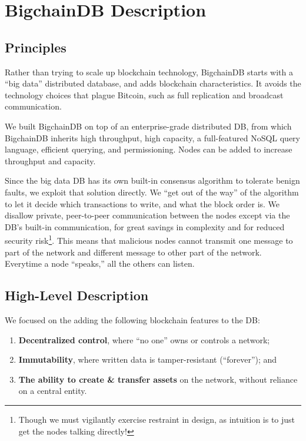 \section{BigchainDB Description}\label{sec:bigchaindb}

\subsection{Principles}
Rather than trying to scale up blockchain technology, BigchainDB starts with a “big data” distributed database, and adds blockchain characteristics.
It avoids the technology choices that plague Bitcoin, such as full replication and broadcast communication.

We built BigchainDB on top of an enterprise-grade distributed DB, from which BigchainDB inherits high throughput, high capacity, a full-featured NoSQL query language, efficient querying, and permissioning. Nodes can be added to increase throughput and capacity.

Since the big data DB has its own built-in consensus algorithm to tolerate benign faults, we exploit that solution directly.
We “get out of the way” of the algorithm to let it decide which transactions to write, and what the block order is.
We disallow private, peer-to-peer communication between the nodes except via the DB’s built-in communication, for great savings in complexity and for reduced security risk\footnote{Though we must vigilantly exercise restraint in design, as intuition is to just get the nodes talking directly!}.
This means that malicious nodes cannot transmit one message to part of the network and different message to other part of the network. Everytime a node ``speaks,'' all the others can listen.

\subsection{High-Level Description}
We focused on the adding the following blockchain features to the DB:
\begin{enumerate}
 \item \textbf{Decentralized control}, where “no one” owns or controls a network;
 \item \textbf{Immutability}, where written data is tamper-resistant (“forever”); and
 \item \textbf{The ability to create \& transfer assets} on the network, without reliance on a central entity.
\end{enumerate}

